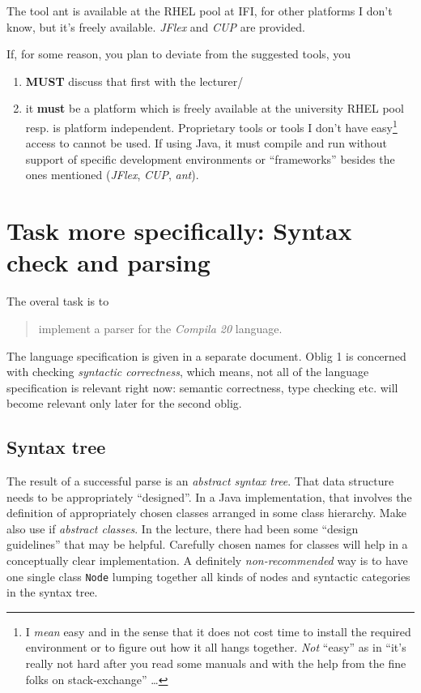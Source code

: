 \documentclass[10pt,freeform]{handout}[2014/08/13]
\begin{document}
The tool ant is available at the RHEL pool at IFI, for other platforms I
don't know, but it's freely available. \textsl{JFlex} and \textsl{CUP} are
provided.

If, for some reason, you plan to deviate from the suggested tools, you
\begin{enumerate}
\item \textbf{MUST} discuss that first with the lecturer/
\item it \textbf{must} be a platform which is freely available at the
  university RHEL pool resp. is  platform independent. Proprietary tools or
  tools I don't have easy\footnote{I \emph{mean} easy and in the sense that
    it does not cost time to install the required environment or to figure
    out how it all hangs together. \emph{Not} ``easy'' as in ``it's really
    not hard after you read some manuals and with the help from the fine
    folks on stack-exchange'' \ldots} access to cannot be used. If using Java, it
  must compile and run without support of specific development environments
  or ``frameworks'' besides the ones mentioned (\textsl{JFlex},
  \textsl{CUP}, \textsl{ant}).
\end{enumerate}



\section{Task more specifically: Syntax check and parsing}
\label{sec:task-more-spec}


The overal task is to 

\begin{quote}
  implement a parser for the \textsl{Compila 20} language.
\end{quote}
The language specification is given in a separate document. Oblig 1 is
concerned with checking \emph{syntactic correctness}, which means, not all
of the language specification is relevant right now: semantic correctness,
type checking etc. will become relevant only later for the second oblig.


\subsection{Syntax tree}
\label{sec:syntax-tree}

The result of a successful parse is an \emph{abstract syntax tree}. That
data structure needs to be appropriately ``designed''. In a Java
implementation, that involves the definition of appropriately chosen
classes arranged in some class hierarchy. Make also use if \emph{abstract
  classes}. In the lecture, there had been some ``design guidelines'' that
may be helpful. Carefully chosen names for classes will help in a
conceptually clear implementation. A definitely \emph{non-recommended} way
is to have one single class \texttt{Node} lumping together all kinds of
nodes and syntactic categories in the syntax tree.
\end{document}
